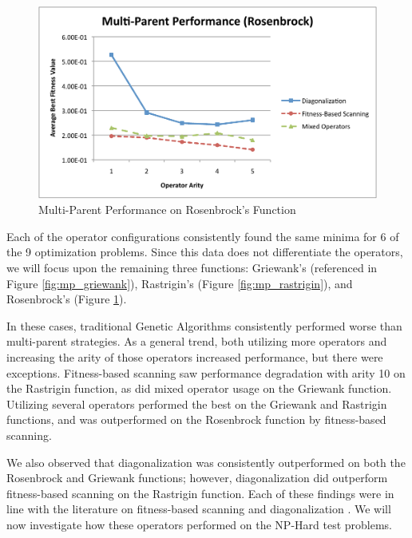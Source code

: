 \begin{figure}[htbp!]
\centering
\includegraphics[scale=0.70]{charts/MP_Rosenbrock.pdf}
\caption{Multi-Parent Performance on Rosenbrock's Function}
\label{fig:mp_rosenbrock}
\end{figure}

Each of the operator configurations consistently found the same minima for 6 of the 9 optimization problems. Since this data does not differentiate the operators, we will focus upon the remaining three functions:  Griewank's (referenced in Figure \ref{fig:mp_griewank}), Rastrigin's (Figure \ref{fig:mp_rastrigin}), and Rosenbrock's (Figure \ref{fig:mp_rosenbrock}).

In these cases, traditional Genetic Algorithms consistently performed worse than multi-parent strategies. As a general trend, both utilizing more operators and increasing the arity of those operators increased performance, but there were exceptions. Fitness-based scanning saw performance degradation with arity 10 on the Rastrigin function, as did mixed operator usage on the Griewank function. Utilizing several operators performed the best on the Griewank and Rastrigin functions, and was outperformed on the Rosenbrock function by fitness-based scanning.

We also observed that diagonalization was consistently outperformed on both the Rosenbrock and Griewank functions; however, diagonalization did outperform fitness-based scanning on the Rastrigin function. Each of these findings were in line with the literature on fitness-based scanning and diagonalization \cite{Eiben94, Eiben95}. We will now investigate how these operators performed on the NP-Hard test problems.

